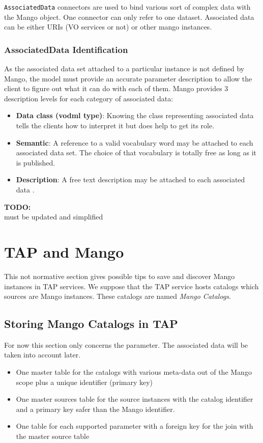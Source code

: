\documentclass[11pt,a4paper]{ivoa}
\newcommand{\TODO}[1]{%
    \noindent%
    \colorbox{todocolor}{%
            \parbox{0.85\linewidth}{\sffamily \textbf{TODO:}\\
            #1}
    }%
    \vspace{2pt}

}
\begin{document}
\texttt{AssociatedData} connectors are used to bind various sort of complex data with the Mango object.
One connector can only refer to one dataset.
Associated data can be either URIs (VO services or not) or other mango instances.

\subsubsection{AssociatedData Identification}
As the associated data set  attached to a particular instance is not defined by Mango,
the model must provide an accurate parameter description to allow the client to figure out what it can do with each of them.
Mango provides 3 description levels for each category of associated data:

\begin{itemize}
    \item \textbf{Data class (vodml type)}: Knowing the class representing associated data
          tells the clients  how to interpret it but does help to get its role.
    \item \textbf{Semantic}: A reference to  a valid vocabulary word may be attached to
          each associated data set.
          The choice of that vocabulary is totally free as long as it is published.
    \item \textbf{Description}: A free text description may be attached to each associated data .
\end{itemize}




\TODO{must be updated and simplified}
\section{TAP and Mango}
This not normative section gives possible tips to save and discover Mango instances in TAP services.
We suppose that the TAP service hosts catalogs which sources are Mango instances. These catalogs are named \emph{Mango Catalogs}.

\subsection{Storing Mango Catalogs in TAP}
For now this section only concerns the parameter. The associated data will be taken into account later.

\begin{itemize}
  \item One master table for the catalogs with various meta-data out of the Mango scope plus a unique identifier (primary key)
  \item One master sources table for the source instances with the catalog identifier and a primary key safer than the Mango identifier.
  \item One table for each supported parameter with a foreign key for the join with the master source table
\end{itemize}
\end{document}
